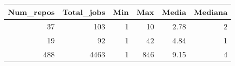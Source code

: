 \begin{tabular}{rrrrrr}
\toprule
 Num\_repos &  Total\_jobs &  Min &  Max &  Media &  Mediana \\
\midrule
        37 &         103 &    1 &   10 &   2.78 &        2 \\
        19 &          92 &    1 &   42 &   4.84 &        1 \\
       488 &        4463 &    1 &  846 &   9.15 &        4 \\
\bottomrule
\end{tabular}
